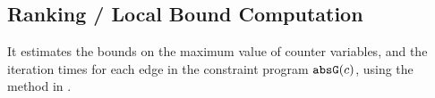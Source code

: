 \subsection{Ranking / Local Bound Computation}
\label{sec:ranking}
It estimates the bounds on the maximum value of counter variables, and
the iteration times
for each edge in the constraint program $\mathtt{abs}{\mathtt{G}}(c)$, using the method in \cite{sinn2017complexity}.

